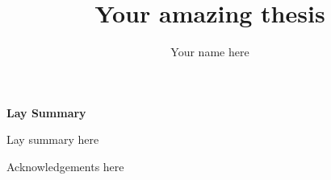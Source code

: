 \documentclass[phd,ilcc,twoside,logo]{infthesis}
\title{Your amazing thesis}
\author{Your name here}
\begin{document}
\begin{preliminary}

\maketitle

\cleardoublepage
\begin{center}
\textsf{\textbf{\LARGE Lay Summary}}
\end{center}
Lay summary here

\cleardoublepage

\begin{acknowledgements}
Acknowledgements here
\end{acknowledgements}

\standarddeclaration


\tableofcontents


\end{preliminary}




%





\end{document}
